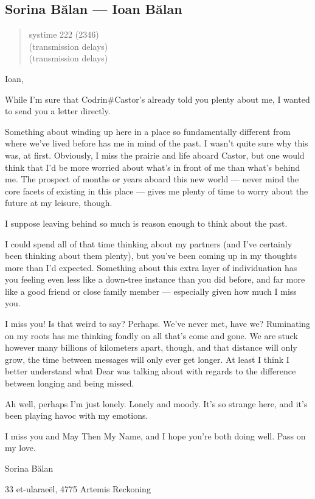 \hypertarget{sorina-bux103lan-ioan-bux103lan}{%
\subsection{Sorina Bălan — Ioan Bălan}\label{sorina-bux103lan-ioan-bux103lan}}

\begin{quote}
systime 222 (2346)\\
(transmission delays)\\
(transmission delays)
\end{quote}

Ioan,

While I'm sure that Codrin\#Castor's already told you plenty about me, I wanted to send you a letter directly.

Something about winding up here in a place so fundamentally different from where we've lived before has me in mind of the past. I wasn't quite sure why this was, at first. Obviously, I miss the prairie and life aboard Castor, but one would think that I'd be more worried about what's in front of me than what's behind me. The prospect of months or years aboard this new world — never mind the core facets of existing in this place — gives me plenty of time to worry about the future at my leisure, though.

I suppose leaving behind so much is reason enough to think about the past.

I could spend all of that time thinking about my partners (and I've certainly been thinking about them plenty), but you've been coming up in my thoughts more than I'd expected. Something about this extra layer of individuation has you feeling even less like a down-tree instance than you did before, and far more like a good friend or close family member — especially given how much I miss you.

I miss you! Is that weird to say? Perhaps. We've never met, have we? Ruminating on my roots has me thinking fondly on all that's come and gone. We are stuck however many billions of kilometers apart, though, and that distance will only grow, the time between messages will only ever get longer. At least I think I better understand what Dear was talking about with regards to the difference between longing and being missed.

Ah well, perhaps I'm just lonely. Lonely and moody. It's so strange here, and it's been playing havoc with my emotions.

I miss you and May Then My Name, and I hope you're both doing well. Pass on my love.

Sorina Bălan

33 et-ularaeël, 4775 Artemis Reckoning
